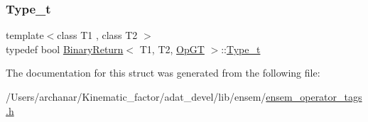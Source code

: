 \subsubsection{\texorpdfstring{Type\_t}{Type\_t}\hspace{0.1cm}{\footnotesize\ttfamily [2/2]}}
{\footnotesize\ttfamily template$<$class T1 , class T2 $>$ \\
typedef bool \mbox{\hyperlink{structBinaryReturn}{Binary\+Return}}$<$ T1, T2, \mbox{\hyperlink{structOpGT}{Op\+GT}} $>$\+::\mbox{\hyperlink{structBinaryReturn_3_01T1_00_01T2_00_01OpGT_01_4_ac4478a3194da16a795fb10b5a100ff48}{Type\+\_\+t}}}



The documentation for this struct was generated from the following file\+:\begin{DoxyCompactItemize}
\item 
/\+Users/archanar/\+Kinematic\+\_\+factor/adat\+\_\+devel/lib/ensem/\mbox{\hyperlink{lib_2ensem_2ensem__operator__tags_8h}{ensem\+\_\+operator\+\_\+tags.\+h}}\end{DoxyCompactItemize}
